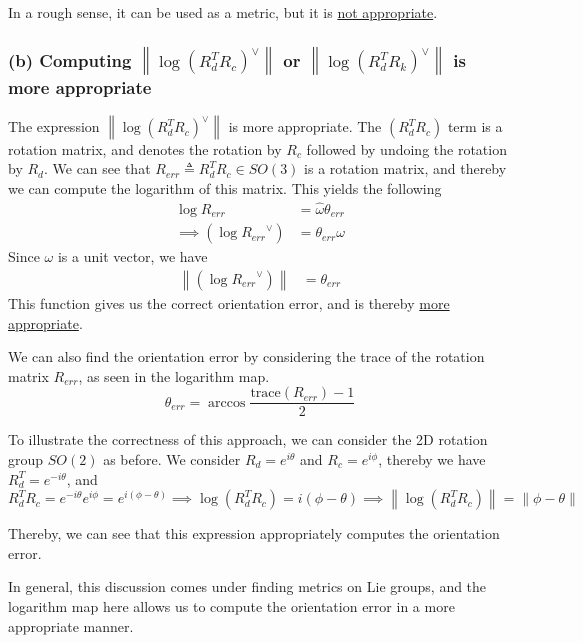 In a rough sense, it can be used as a metric, but it is \underline{not appropriate}.

\subsubsection*{(b) Computing \( \left \| \log {\left(R_{d}^{T} R_{c}\right)}^{\vee}\right \| \) or \( \left \| \log {\left(R_{d}^{T} R_{k}\right)}^{\vee}\right \| \) is more appropriate}

The expression \( \left \| \log {\left(R_{d}^{T} R_{c}\right)}^{\vee}\right \| \) is more appropriate.
The \( \left(R_{d}^{T} R_{c}\right) \) term is a rotation matrix, and denotes the rotation by \( R_c \) followed by undoing the rotation by \( R_d \).
We can see that \( R_{err} \triangleq R_d^{T} R_c \in SO(3) \) is a rotation matrix, and thereby we can compute the logarithm of this matrix.
This yields the following
\begin{align*}
      \log R_{err}
       & =
      \hat{\omega} \theta_{err}
      \\
      \implies
      ({\log R_{err}}^{\vee})
       & =
      \theta_{err} \omega
\end{align*}
Since \( \omega \) is a unit vector, we have
\begin{align*}
      \left \| ({\log R_{err}}^{\vee}) \right \|
       & =
      \theta_{err}
\end{align*}
This function gives us the correct orientation error, and is thereby \underline{more appropriate}.

We can also find the orientation error by considering the trace of the rotation matrix \( R_{err} \), as seen in the logarithm map.
\begin{equation*}
      \theta_{err} = \arccos{\frac{\text{trace}(R_{err}) - 1 }{2}}
\end{equation*}

To illustrate the correctness of this approach, we can consider the 2D rotation group \( SO(2) \) as before.
We consider \( R_d = e^{i \theta} \) and \( R_c = e^{i \phi} \), thereby we have \( R_d^T = e^{-i \theta} \), and
\[
      R_d^T R_c = e^{-i \theta} e^{i \phi} = e^{i (\phi - \theta)}
      \implies
      \log (R_d^T R_c) = i (\phi - \theta)
      \implies
      \left \| \log (R_d^T R_c) \right \| = \left \| \phi - \theta \right \|
\]

Thereby, we can see that this expression appropriately computes the orientation error.

In general, this discussion comes under finding metrics on Lie groups, and the logarithm map here allows us to compute the orientation error in a more appropriate manner.

